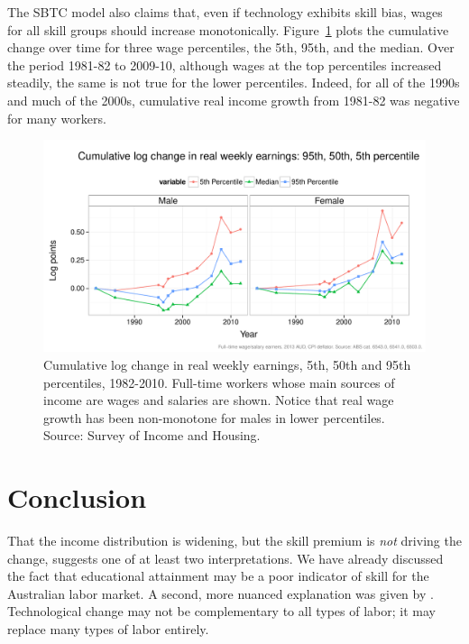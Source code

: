 The SBTC model also claims that, even if technology exhibits skill bias, wages for all skill groups should increase monotonically. Figure~\ref{fig:changetime} plots the cumulative change over time for three wage percentiles, the 5th, 95th, and the median. Over the period 1981-82 to 2009-10, although wages at the top percentiles increased steadily, the same is not true for the lower percentiles. Indeed, for all of the 1990s and much of the 2000s, cumulative real income growth from 1981-82 was negative for many workers.
\begin{figure}
  \centering
  \includegraphics[width=\textwidth]{../figure/wage_change_time.pdf}
  \caption{Cumulative log change in real weekly earnings, 5th, 50th and 95th percentiles, 1982-2010. Full-time workers whose main sources of income are wages and salaries are shown. Notice that real wage growth has been non-monotone for males in lower percentiles. Source: Survey of Income and Housing.}
  \label{fig:changetime}
\end{figure}

\section{Conclusion}

That the income distribution is widening, but the skill premium is {\em not} driving the change, suggests one of at least two interpretations. We have already discussed the fact that educational attainment may be a poor indicator of skill for the Australian labor market. A second, more nuanced explanation was given by \citet{Levy2003}. Technological change may not be complementary to all types of labor; it may replace many types of labor entirely.





